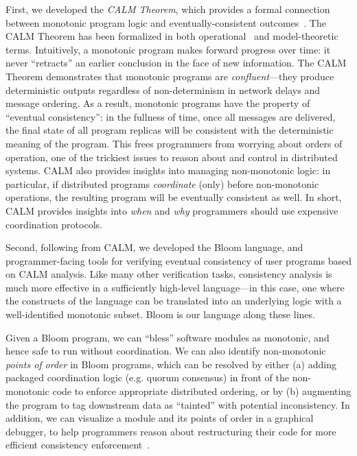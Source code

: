First, we developed the \emph{CALM Theorem}, which provides a formal connection between monotonic program logic and eventually-consistent outcomes~\cite{podskey}.  The CALM Theorem has been formalized in both operational~\cite{Ameloot2011,Abiteboul11} and model-theoretic~\cite{marczak2012} terms.    Intuitively, a monotonic program makes forward progress over time: it never “retracts” an earlier conclusion in the face of new information.   The CALM Theorem demonstrates that monotonic programs are \emph{confluent}---they produce deterministic outputs regardless of non-determinism in network delays and message ordering.  As a result, monotonic programs have the property of ``eventual consistency'': in the fullness of time, once all messages are delivered, the final state of all program replicas will be consistent with the deterministic meaning of the program.  This frees programmers from worrying about orders of operation, one of the trickiest issues to reason about and control in distributed systems.  CALM also provides insights into managing non-monotonic logic: in particular, if distributed programs \emph{coordinate} (only) before non-monotonic operations, the resulting program will be eventually consistent as well.  In short, CALM provides insights into \emph{when} and \emph{why} programmers should use expensive coordination protocols.

Second, following from CALM, we developed the Bloom language, and programmer-facing tools for verifying eventual consistency of user programs based on CALM analysis. Like many other verification tasks, consistency analysis is much more effective in a sufficiently high-level language---in this case, one where the constructs of the language can be translated into an underlying logic with a well-identified monotonic subset. Bloom is our language along these lines. 

Given a Bloom program, we can ``bless'' software modules as monotonic, and hence safe to run without coordination.  We can also identify non-monotonic \emph{points of order} in Bloom programs, which can be resolved by either (a) adding packaged coordination logic (e.g. quorum consensus) in front of the non-monotonic code to enforce appropriate distributed ordering, or by (b) augmenting the program to tag downstream data as “tainted” with potential inconsistency.  In addition, we can visualize a module and its points of order in a graphical debugger, to help programmers reason about restructuring their code for more efficient consistency enforcement~\cite{bloom}.


